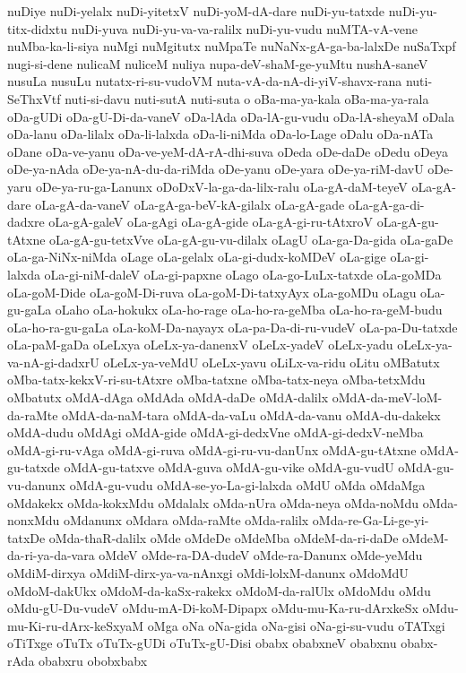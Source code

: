 {nuDiye
nuDi-yelalx
nuDi-yitetxV
nuDi-yoM-dA-dare
nuDi-yu-tatxde
nuDi-yu-titx-didxtu
nuDi-yuva
nuDi-yu-va-va-ralilx
nuDi-yu-vudu
nuMTA-vA-vene
nuMba-ka-li-siya
nuMgi
nuMgitutx
nuMpaTe
nuNaNx-gA-ga-ba-lalxDe
nuSaTxpf
nugi-si-dene
nulicaM
nuliceM
nuliya
nupa-deV-shaM-ge-yuMtu
nushA-saneV
nusuLa
nusuLu
nutatx-ri-su-vudoVM
nuta-vA-da-nA-di-yiV-shavx-rana
nuti-SeThxVtf
nuti-si-davu
nuti-sutA
nuti-suta
o
oBa-ma-ya-kala
oBa-ma-ya-rala
oDa-gUDi
oDa-gU-Di-da-vaneV
oDa-lAda
oDa-lA-gu-vudu
oDa-lA-sheyaM
oDala
oDa-lanu
oDa-lilalx
oDa-li-lalxda
oDa-li-niMda
oDa-lo-Lage
oDalu
oDa-nATa
oDane
oDa-ve-yanu
oDa-ve-yeM-dA-rA-dhi-suva
oDeda
oDe-daDe
oDedu
oDeya
oDe-ya-nAda
oDe-ya-nA-du-da-riMda
oDe-yanu
oDe-yara
oDe-ya-riM-davU
oDe-yaru
oDe-ya-ru-ga-Lanunx
oDoDxV-la-ga-da-lilx-ralu
oLa-gA-daM-teyeV
oLa-gA-dare
oLa-gA-da-vaneV
oLa-gA-ga-beV-kA-gilalx
oLa-gA-gade
oLa-gA-ga-di-dadxre
oLa-gA-galeV
oLa-gAgi
oLa-gA-gide
oLa-gA-gi-ru-tAtxroV
oLa-gA-gu-tAtxne
oLa-gA-gu-tetxVve
oLa-gA-gu-vu-dilalx
oLagU
oLa-ga-Da-gida
oLa-gaDe
oLa-ga-NiNx-niMda
oLage
oLa-gelalx
oLa-gi-dudx-koMDeV
oLa-gige
oLa-gi-lalxda
oLa-gi-niM-daleV
oLa-gi-papxne
oLago
oLa-go-LuLx-tatxde
oLa-goMDa
oLa-goM-Dide
oLa-goM-Di-ruva
oLa-goM-Di-tatxyAyx
oLa-goMDu
oLagu
oLa-gu-gaLa
oLaho
oLa-hokukx
oLa-ho-rage
oLa-ho-ra-geMba
oLa-ho-ra-geM-budu
oLa-ho-ra-gu-gaLa
oLa-koM-Da-nayayx
oLa-pa-Da-di-ru-vudeV
oLa-pa-Du-tatxde
oLa-paM-gaDa
oLeLxya
oLeLx-ya-danenxV
oLeLx-yadeV
oLeLx-yadu
oLeLx-ya-va-nA-gi-dadxrU
oLeLx-ya-veMdU
oLeLx-yavu
oLiLx-va-ridu
oLitu
oMBatutx
oMba-tatx-kekxV-ri-su-tAtxre
oMba-tatxne
oMba-tatx-neya
oMba-tetxMdu
oMbatutx
oMdA-dAga
oMdAda
oMdA-daDe
oMdA-dalilx
oMdA-da-meV-loM-da-raMte
oMdA-da-naM-tara
oMdA-da-vaLu
oMdA-da-vanu
oMdA-du-dakekx
oMdA-dudu
oMdAgi
oMdA-gide
oMdA-gi-dedxVne
oMdA-gi-dedxV-neMba
oMdA-gi-ru-vAga
oMdA-gi-ruva
oMdA-gi-ru-vu-danUnx
oMdA-gu-tAtxne
oMdA-gu-tatxde
oMdA-gu-tatxve
oMdA-guva
oMdA-gu-vike
oMdA-gu-vudU
oMdA-gu-vu-danunx
oMdA-gu-vudu
oMdA-se-yo-La-gi-lalxda
oMdU
oMda
oMdaMga
oMdakekx
oMda-kokxMdu
oMdalalx
oMda-nUra
oMda-neya
oMda-noMdu
oMda-nonxMdu
oMdanunx
oMdara
oMda-raMte
oMda-ralilx
oMda-re-Ga-Li-ge-yi-tatxDe
oMda-thaR-dalilx
oMde
oMdeDe
oMdeMba
oMdeM-da-ri-daDe
oMdeM-da-ri-ya-da-vara
oMdeV
oMde-ra-DA-dudeV
oMde-ra-Danunx
oMde-yeMdu
oMdiM-dirxya
oMdiM-dirx-ya-va-nAnxgi
oMdi-lolxM-danunx
oMdoMdU
oMdoM-dakUkx
oMdoM-da-kaSx-rakekx
oMdoM-da-ralUlx
oMdoMdu
oMdu
oMdu-gU-Du-vudeV
oMdu-mA-Di-koM-Dipapx
oMdu-mu-Ka-ru-dArxkeSx
oMdu-mu-Ki-ru-dArx-keSxyaM
oMga
oNa
oNa-gida
oNa-gisi
oNa-gi-su-vudu
oTATxgi
oTiTxge
oTuTx
oTuTx-gUDi
oTuTx-gU-Disi
obabx
obabxneV
obabxnu
obabx-rAda
obabxru
obobxbabx
}
